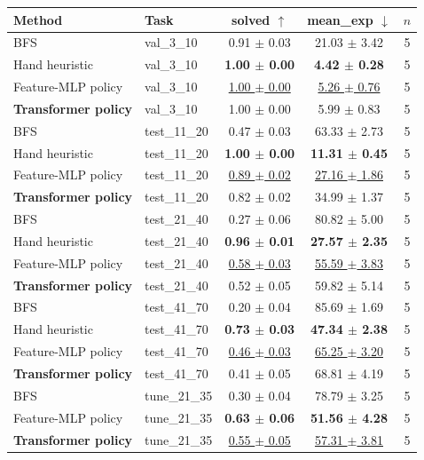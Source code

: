\begin{tabular}{llccc}
\toprule
Method & Task & solved $\uparrow$ & mean\_exp $\downarrow$ & $n$ \\
\midrule
BFS & val\_3\_10 & 0.91 $\pm$ 0.03 & 21.03 $\pm$ 3.42 & 5 \\
Hand heuristic & val\_3\_10 & \textbf{1.00 $\pm$ 0.00} & \textbf{4.42 $\pm$ 0.28} & 5 \\
Feature-MLP policy & val\_3\_10 & \underline{1.00 $\pm$ 0.00} & \underline{5.26 $\pm$ 0.76} & 5 \\
\textbf{Transformer policy} & val\_3\_10 & 1.00 $\pm$ 0.00 & 5.99 $\pm$ 0.83 & 5 \\
\midrule
BFS & test\_11\_20 & 0.47 $\pm$ 0.03 & 63.33 $\pm$ 2.73 & 5 \\
Hand heuristic & test\_11\_20 & \textbf{1.00 $\pm$ 0.00} & \textbf{11.31 $\pm$ 0.45} & 5 \\
Feature-MLP policy & test\_11\_20 & \underline{0.89 $\pm$ 0.02} & \underline{27.16 $\pm$ 1.86} & 5 \\
\textbf{Transformer policy} & test\_11\_20 & 0.82 $\pm$ 0.02 & 34.99 $\pm$ 1.37 & 5 \\
\midrule
BFS & test\_21\_40 & 0.27 $\pm$ 0.06 & 80.82 $\pm$ 5.00 & 5 \\
Hand heuristic & test\_21\_40 & \textbf{0.96 $\pm$ 0.01} & \textbf{27.57 $\pm$ 2.35} & 5 \\
Feature-MLP policy & test\_21\_40 & \underline{0.58 $\pm$ 0.03} & \underline{55.59 $\pm$ 3.83} & 5 \\
\textbf{Transformer policy} & test\_21\_40 & 0.52 $\pm$ 0.05 & 59.82 $\pm$ 5.14 & 5 \\
\midrule
BFS & test\_41\_70 & 0.20 $\pm$ 0.04 & 85.69 $\pm$ 1.69 & 5 \\
Hand heuristic & test\_41\_70 & \textbf{0.73 $\pm$ 0.03} & \textbf{47.34 $\pm$ 2.38} & 5 \\
Feature-MLP policy & test\_41\_70 & \underline{0.46 $\pm$ 0.03} & \underline{65.25 $\pm$ 3.20} & 5 \\
\textbf{Transformer policy} & test\_41\_70 & 0.41 $\pm$ 0.05 & 68.81 $\pm$ 4.19 & 5 \\
\midrule
BFS & tune\_21\_35 & 0.30 $\pm$ 0.04 & 78.79 $\pm$ 3.25 & 5 \\
Feature-MLP policy & tune\_21\_35 & \textbf{0.63 $\pm$ 0.06} & \textbf{51.56 $\pm$ 4.28} & 5 \\
\textbf{Transformer policy} & tune\_21\_35 & \underline{0.55 $\pm$ 0.05} & \underline{57.31 $\pm$ 3.81} & 5 \\
\bottomrule
\end{tabular}
